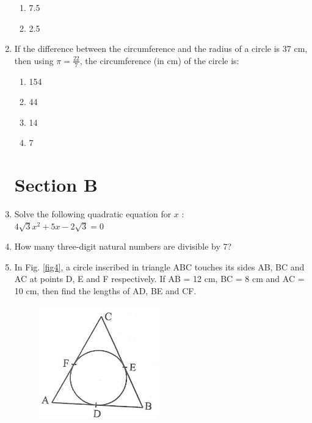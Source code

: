 \documentclass[journal,12pt,twocolumn]{IEEEtran}
\renewcommand\thesection{\arabic{section}}
\begin{document}
\begin{enumerate}[label=\thesection.\arabic*.,ref=\thesection.\theenumi]
\begin{enumerate}
    \item 7.5\\
    \item 2.5
 \end{enumerate}
\item If the difference between the circumference and the radius of a circle is 37 cm, then using $\pi=\frac{22}{7}$, the circumference (in cm) of the circle is:
 \begin{enumerate}
    \item 154\\
    \item 44\\
    \item 14\\
    \item 7
 \end{enumerate}
\section{Section B}
\item Solve the following quadratic equation for $x$ :\\ $4\sqrt{3}x^2+5x-2\sqrt{3}=0$
\item How many three-digit natural numbers are divisible by 7?
\item In Fig. \ref{fig4}, a circle inscribed in triangle ABC touches its sides AB, BC and AC at points D, E and F respectively. If AB = 12 cm, BC = 8 cm and AC = 10 cm, then find the lengths of AD, BE and CF.
	\begin{figure}
		\centering
\includegraphics[width=\columnwidth]{4.png}

\end{figure}
\end{enumerate}
\end{document}

